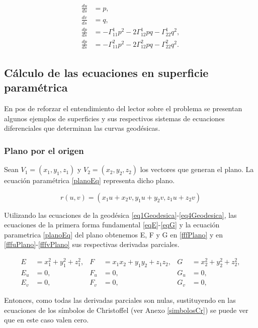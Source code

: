 \documentclass{endm}
\begin{document}
\small{
\begin{align} 
\frac{du}{ds}&=p, \label{eq1Geodesica}\\
\frac{dv}{ds}&=q, \label{eq2Geodesica}    \\
\frac{dp}{ds}&= - \Gamma_{11}^1 p^2 -2 \Gamma_{12}^1 pq - \Gamma_{22}^1 q^2, \label{eq3Geodesica}\\ 
\frac{dp}{ds}&=- \Gamma_{11}^2 p^2 -2 \Gamma_{12}^2 pq - \Gamma_{22}^2 q^2. \label{eq4Geodesica}
\end{align}
}
\subsection{C\'alculo de las ecuaciones en superficie param\'etrica}
En pos de reforzar el entendimiento del lector sobre el problema se presentan algunos ejemplos de superficies y sus respectivos sistemas de ecuaciones diferenciales que determinan las curvas geod\'esicas.

\subsubsection{Plano por el origen}
Sean $V_1=(x_1,y_1,z_1)$ y $V_2=(x_2,y_2,z_2)$ los vectores que generan el plano.
La ecuaci\'on param\'etrica \ref{planoEq} representa dicho plano.

\begin{equation} \label{planoEq}
r(u,v) = (x_1 u + x_2 v, y_1 u + y_2 v, z_1 u + z_2 v)
\end{equation}

Utilizando las ecuaciones de la geod\'esica \ref{eq1Geodesica}-\ref{eq4Geodesica}, las ecuaciones de la primera forma fundamental \ref{eqE}-\ref{eqG} y la ecuaci\'on parametrica \ref{planoEq} del plano obtenemos E, F y G en \ref{fffPlano}  y en \ref{fffuPlano}-\ref{fffvPlano} sus respectivas derivadas parciales.

\begin{align} 
E&=x_1^2 + y_1^2 + z_1^2,   & F &=x_1 x_2 + y_1 y_2 + z_1 z_2,   & G&=x_2^2 + y_2^2 + z_2^2, \label{fffPlano} \\
E_u&=0,     & F_u&=0,   & G_u&=0, \label{fffuPlano}\\
E_v&=0,    & F_v&=0,   & G_v&=0, \label{fffvPlano}
\end{align}

Entonces, como todas las derivadas parciales son nulas, sustituyendo en las ecuaciones de los s\'imbolos de Christoffel (ver Anexo \ref{simbolosCr}) se puede ver que en este caso valen cero.
\end{document}
